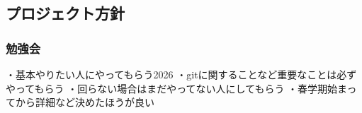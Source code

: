 \subsection*{プロジェクト方針}


\subsubsection*{勉強会}
・基本やりたい人にやってもらう2026
・gitに関することなど重要なことは必ずやってもらう
・回らない場合はまだやってない人にしてもらう
・春学期始まってから詳細など決めたほうが良い

